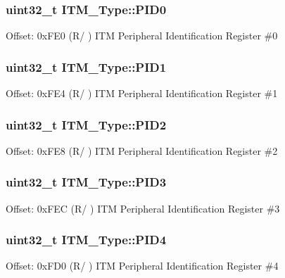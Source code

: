 \subsubsection[{\texorpdfstring{P\+I\+D0}{PID0}}]{ uint32\+\_\+t I\+T\+M\+\_\+\+Type\+::\+P\+I\+D0}\hypertarget{structITM__Type_ab69ade751350a7758affdfe396517535}{}\label{structITM__Type_ab69ade751350a7758affdfe396517535}
Offset\+: 0x\+F\+E0 (R/ ) I\+TM Peripheral Identification Register \#0 
\subsubsection[{\texorpdfstring{P\+I\+D1}{PID1}}]{ uint32\+\_\+t I\+T\+M\+\_\+\+Type\+::\+P\+I\+D1}\hypertarget{structITM__Type_a30e87ec6f93ecc9fe4f135ca8b068990}{}\label{structITM__Type_a30e87ec6f93ecc9fe4f135ca8b068990}
Offset\+: 0x\+F\+E4 (R/ ) I\+TM Peripheral Identification Register \#1 
\subsubsection[{\texorpdfstring{P\+I\+D2}{PID2}}]{ uint32\+\_\+t I\+T\+M\+\_\+\+Type\+::\+P\+I\+D2}\hypertarget{structITM__Type_ae139d2e588bb382573ffcce3625a88cd}{}\label{structITM__Type_ae139d2e588bb382573ffcce3625a88cd}
Offset\+: 0x\+F\+E8 (R/ ) I\+TM Peripheral Identification Register \#2 
\subsubsection[{\texorpdfstring{P\+I\+D3}{PID3}}]{ uint32\+\_\+t I\+T\+M\+\_\+\+Type\+::\+P\+I\+D3}\hypertarget{structITM__Type_af006ee26c7e61c9a3712a80ac74a6cf3}{}\label{structITM__Type_af006ee26c7e61c9a3712a80ac74a6cf3}
Offset\+: 0x\+F\+EC (R/ ) I\+TM Peripheral Identification Register \#3 
\subsubsection[{\texorpdfstring{P\+I\+D4}{PID4}}]{ uint32\+\_\+t I\+T\+M\+\_\+\+Type\+::\+P\+I\+D4}\hypertarget{structITM__Type_accfc7de00b0eaba0301e8f4553f70512}{}\label{structITM__Type_accfc7de00b0eaba0301e8f4553f70512}
Offset\+: 0x\+F\+D0 (R/ ) I\+TM Peripheral Identification Register \#4 
